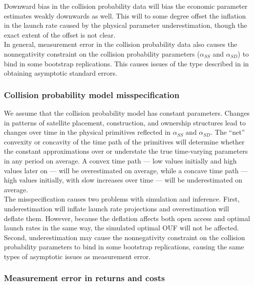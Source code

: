 \documentclass[9pt,twoside,lineno]{pnas-new}
\begin{document}
Downward bias in the collision probability data will bias the economic parameter estimates weakly downwards as well. This will to some degree offset the inflation in the launch rate caused by the physical parameter underestimation, though the exact extent of the offset is not clear. \\

In general, measurement error in the collision probability data also causes the nonnegativity constraint on the collision probability parameters ($\alpha_{SS}$ and $\alpha_{SD}$) to bind in some bootstrap replications. This causes issues of the type described in \cite{ketz2018} in obtaining asymptotic standard errors.

\subsubsection{Collision probability model misspecification}

We assume that the collision probability model has constant parameters. Changes in patterns of satellite placement, construction, and ownership structures lead to changes over time in the physical primitives reflected in $\alpha_{SS}$ and $\alpha_{SD}$. The ``net'' convexity or concavity of the time path of the primitives will determine whether the constant approximations over or understate the true time-varying parameters in any period on average. A convex time path --- low values initially and high values later on --- will be overestimated on average, while a concave time path --- high values initially, with slow increases over time --- will be underestimated on average. \\

The misspecification causes two problems with simulation and inference. First, underestimation will inflate launch rate projections and overestimation will deflate them. However, because the deflation affects both open access and optimal launch rates in the same way, the simulated optimal OUF will not be affected. Second, underestimation may cause the nonnegativity constraint on the collision probability parameters to bind in some bootstrap replications, causing the same types of asymptotic issues as measurement error.

\subsubsection{Measurement error in returns and costs}
\label{attenuationFactors}
\end{document}
